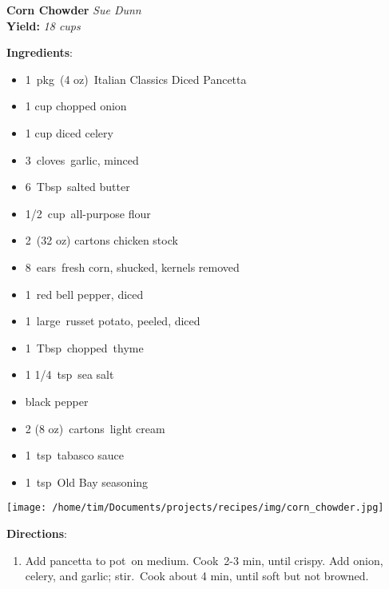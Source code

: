 \documentclass[11pt, twoside, openany]{book}
\begin{document}
\noindent\begin{minipage}[t]{\linewidth}%
{\Large\textbf{Corn Chowder}} \label{corn-chowder}\hfill\textit{Sue Dunn}\\
\textbf{Yield:} \textit{18 cups}\\
\noindent\begin{minipage}[t]{0.78\linewidth}%
\textbf{Ingredients}:\vspace{-3mm}
\begin{multicols}{2}
\begin{itemize}\setlength\itemsep{-1mm}
\item 1 pkg (4 oz) Italian Classics Diced Pancetta
\item 1 cup chopped onion
\item 1 cup diced celery
\item 3 cloves garlic, minced
\item 6 Tbsp salted butter
\item 1/2 cup all-purpose flour
\item 2 (32 oz) cartons chicken stock
\item 8 ears fresh corn, shucked, kernels removed
\item 1 red bell pepper, diced
\item 1 large russet potato, peeled, diced
\item 1 Tbsp chopped thyme
\item 1 1/4 tsp sea salt
\item black pepper
\item 2 (8 oz) cartons light cream
\item 1 tsp tabasco sauce
\item 1 tsp Old Bay seasoning
\end{itemize}
\end{multicols}
\end{minipage}
\noindent\begin{minipage}[t]{0.18\linewidth}
\centering \strut\vspace*{-\baselineskip}\newline
\texttt{[image: /home/tim/Documents/projects/recipes/img/corn\_chowder.jpg]}\\
\end{minipage}\vspace{3mm}
\textbf{Directions}:
\vspace{-3mm}\begin{enumerate}\setlength\itemsep{-1mm}
\item Add pancetta to pot on medium. Cook 2-3 min, until crispy. Add onion, celery, and garlic; stir. Cook about 4 min, until soft but not browned.

\end{enumerate}
\end{minipage}
\end{document}
